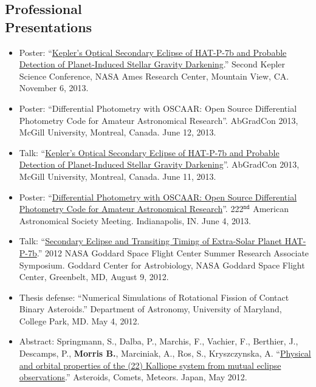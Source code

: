 \documentclass[margin]{res}
\begin{document}
\begin{resume}
\section{Professional\\ Presentations} 
                 \begin{itemize}  %
                 \item Poster: ``\href{http://nexsci.caltech.edu/conferences/KeplerII/posters/morris.pdf}{Kepler's Optical Secondary Eclipse of HAT-P-7b and Probable Detection of Planet-Induced Stellar Gravity Darkening}.'' Second Kepler Science Conference, NASA Ames Research Center, Mountain View, CA. November 6, 2013. 
                 \item Poster: ``Differential Photometry with OSCAAR: Open Source Differential Photometry Code for Amateur Astronomical Research''. AbGradCon 2013, McGill University, Montreal, Canada. June 12, 2013.
                 \item Talk: ``\href{http://youtu.be/ZMfbkCzzQUE}{Kepler's Optical Secondary Eclipse of HAT-P-7b and Probable Detection of Planet-Induced Stellar Gravity Darkening}''. AbGradCon 2013, McGill University, Montreal, Canada. June 11, 2013.
                 \item Poster: ``\href{http://adsabs.harvard.edu/abs/2013AAS...22221717M}{Differential Photometry with OSCAAR: Open Source Differential Photometry Code for Amateur Astronomical Research}''. 222$^\mathtt{nd}$ American Astronomical Society Meeting. Indianapolis, IN. June 4, 2013.
                 \item Talk: ``\href{https://astrobiology.nasa.gov/seminars/featured-seminar-channels/gsfc-summer-internship/2012/08/09/gsfc-summer-research-associate-presentations/}{Secondary Eclipse and Transiting Timing of Extra-Solar Planet HAT-P-7b}.'' 2012 NASA Goddard Space Flight Center Summer Research Associate Symposium. Goddard Center for Astrobiology, NASA Goddard Space Flight Center, Greenbelt, MD, August 9, 2012.
	        \item Thesis defense:  ``Numerical Simulations of Rotational Fission of Contact Binary Asteroids.'' Department of Astronomy, University of Maryland, College Park, MD. May 4, 2012.
                 \item Abstract: Springmann, S., Dalba, P., Marchis, F., Vachier, F., Berthier, J., Descamps, P., \textbf{Morris B.}, 
		Marciniak, A., Ros, S., Kryszczynska, A. ``\href{http://adsabs.harvard.edu/abs/2012LPICo1667.6352S}{Physical and orbital properties of the (22) Kalliope system from mutual eclipse observations}.'' 
		Asteroids, Comets, Meteors. Japan, May 2012.\\
		\end{itemize}


\end{resume}
\end{document}
